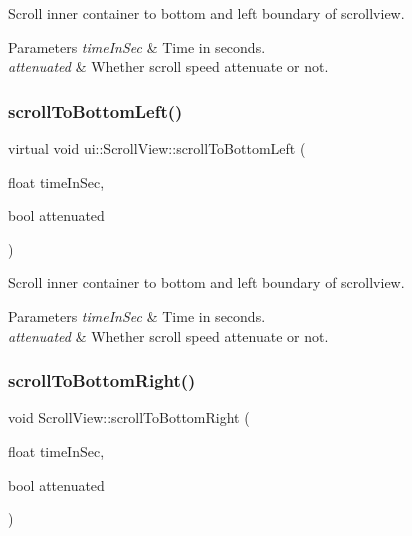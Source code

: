 Scroll inner container to bottom and left boundary of scrollview. 
\begin{DoxyParams}{Parameters}
{\em time\+In\+Sec} & Time in seconds. \\
\hline
{\em attenuated} & Whether scroll speed attenuate or not. \\
\hline
\end{DoxyParams}
\mbox{\label{classui_1_1ScrollView_a79211c66ee7923a121971ab98a23e391}} 
\subsubsection{\texorpdfstring{scroll\+To\+Bottom\+Left()}{scrollToBottomLeft()}\hspace{0.1cm}{\footnotesize\ttfamily [2/2]}}
{\footnotesize\ttfamily virtual void ui\+::\+Scroll\+View\+::scroll\+To\+Bottom\+Left (\begin{DoxyParamCaption}\item[{float}]{time\+In\+Sec,  }\item[{bool}]{attenuated }\end{DoxyParamCaption})\hspace{0.3cm}{\ttfamily [virtual]}}

Scroll inner container to bottom and left boundary of scrollview. 
\begin{DoxyParams}{Parameters}
{\em time\+In\+Sec} & Time in seconds. \\
\hline
{\em attenuated} & Whether scroll speed attenuate or not. \\
\hline
\end{DoxyParams}
\mbox{\label{classui_1_1ScrollView_ab9106c7aac0bd2473833685085199186}} 
\subsubsection{\texorpdfstring{scroll\+To\+Bottom\+Right()}{scrollToBottomRight()}\hspace{0.1cm}{\footnotesize\ttfamily [1/2]}}
{\footnotesize\ttfamily void Scroll\+View\+::scroll\+To\+Bottom\+Right (\begin{DoxyParamCaption}\item[{float}]{time\+In\+Sec,  }\item[{bool}]{attenuated }\end{DoxyParamCaption})\hspace{0.3cm}{\ttfamily [virtual]}}

